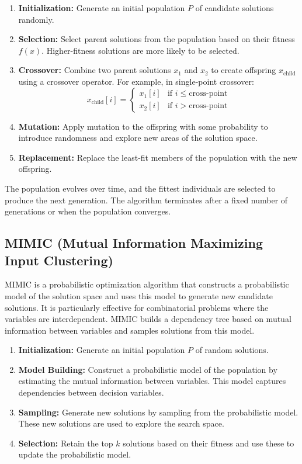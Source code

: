 \begin{enumerate}
    \item \textbf{Initialization:} Generate an initial population $P$ of candidate solutions randomly.
    \item \textbf{Selection:} Select parent solutions from the population based on their fitness $f(x)$. Higher-fitness solutions are more likely to be selected.
    \item \textbf{Crossover:} Combine two parent solutions $x_1$ and $x_2$ to create offspring $x_{\text{child}}$ using a crossover operator. For example, in single-point crossover:
    \[
    x_{\text{child}}[i] =
    \begin{cases} 
    x_1[i] & \text{if } i \leq \text{cross-point} \\ 
    x_2[i] & \text{if } i > \text{cross-point}
    \end{cases}
    \]
    \item \textbf{Mutation:} Apply mutation to the offspring with some probability to introduce randomness and explore new areas of the solution space.
    \item \textbf{Replacement:} Replace the least-fit members of the population with the new offspring.
\end{enumerate}

The population evolves over time, and the fittest individuals are selected to produce the next generation. The algorithm terminates after a fixed number of generations or when the population converges.

\subsection{MIMIC (Mutual Information Maximizing Input Clustering)}
MIMIC is a probabilistic optimization algorithm that constructs a probabilistic model of the solution space and uses this model to generate new candidate solutions. It is particularly effective for combinatorial problems where the variables are interdependent. MIMIC builds a dependency tree based on mutual information between variables and samples solutions from this model.

\begin{enumerate}
    \item \textbf{Initialization:} Generate an initial population $P$ of random solutions.
    \item \textbf{Model Building:} Construct a probabilistic model of the population by estimating the mutual information between variables. This model captures dependencies between decision variables.
    \item \textbf{Sampling:} Generate new solutions by sampling from the probabilistic model. These new solutions are used to explore the search space.
    \item \textbf{Selection:} Retain the top $k$ solutions based on their fitness and use these to update the probabilistic model.
\end{enumerate}

